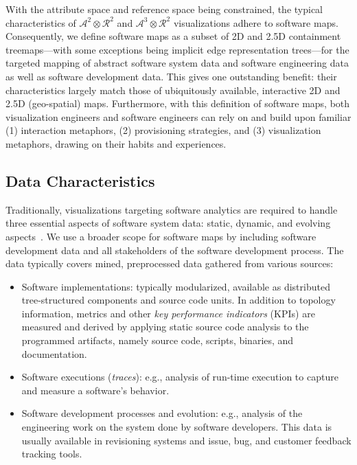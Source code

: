 \documentclass{svjour3}                     %
\begin{document}
With the attribute space and reference space being constrained, the typical characteristics of $\mathcal{A}^2\otimes\mathcal{R}^2$ and $\mathcal{A}^3\otimes\mathcal{R}^2$ visualizations adhere to software maps.
Consequently, we define software maps as a subset of 2D and 2.5D containment treemaps---with some exceptions being implicit edge representation trees---for the targeted mapping of abstract software system data and software engineering data as well as software development data.
This gives one outstanding benefit: their characteristics largely match those of ubiquitously available, interactive 2D and 2.5D (geo-spatial) maps.
Furthermore, with this definition of software maps, both visualization engineers and software engineers can rely on and build upon familiar (1) interaction metaphors, (2) provisioning strategies, and (3) visualization metaphors, drawing on their habits and experiences.

\subsection{Data Characteristics}
Traditionally, visualizations targeting software analytics are required to handle three essential aspects of software system data: static, dynamic, and evolving aspects~\citep{diehl2007-software}.
We use a broader scope for software maps by including software development data and all stakeholders of the software development process.
The data typically covers mined, preprocessed data gathered from various sources:
\begin{itemize}
	\item Software implementations: typically modularized, available as distributed tree-structured components and source code units. In addition to topology information, metrics and other \emph{key performance indicators} (KPIs) are measured and derived by applying static source code analysis to the programmed artifacts, namely source code, scripts, binaries, and documentation.
	\item Software executions (\emph{traces}): e.g., analysis of run-time execution to capture and measure a software's behavior.
	\item Software development processes and evolution: e.g., analysis of the engineering work on the system done by software developers. This data is usually available in revisioning systems and issue, bug, and customer feedback tracking tools.
\end{itemize}
\end{document}
